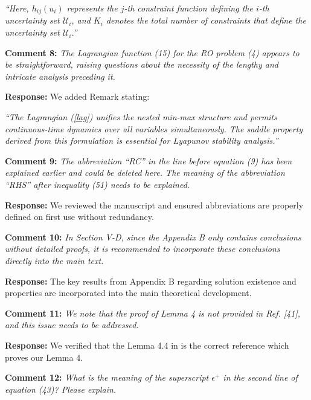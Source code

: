 \documentclass[journal,twoside,web]{ieeecolor}
\begin{document}
{\color{revisionblue}\textit{``Here, $h_{ij}(u_i)$ represents the $j$-th constraint function defining the $i$-th uncertainty set $\mathcal{U}_i$, and $K_i$ denotes the total number of constraints that define the uncertainty set $\mathcal{U}_i$.''}}

\vspace{0.5em}
\noindent\textbf{Comment 8:} \textit{The Lagrangian function (15) for the RO problem (4) appears to be straightforward, raising questions about the necessity of the lengthy and intricate analysis preceding it.}

\noindent\textbf{Response:} We added Remark stating:

{\color{revisionblue}\textit{``The Lagrangian (\ref{lag}) unifies the nested min-max structure and permits continuous-time dynamics over all variables simultaneously. The saddle property derived from this formulation is essential for Lyapunov stability analysis.''}}

\vspace{0.5em}
\noindent\textbf{Comment 9:} \textit{The abbreviation ``RC'' in the line before equation (9) has been explained earlier and could be deleted here. The meaning of the abbreviation ``RHS'' after inequality (51) needs to be explained.}

\noindent\textbf{Response:} We reviewed the manuscript and ensured abbreviations are properly defined on first use without redundancy.

\vspace{0.5em}
\noindent\textbf{Comment 10:} \textit{In Section V-D, since the Appendix B only contains conclusions without detailed proofs, it is recommended to incorporate these conclusions directly into the main text.}

\noindent\textbf{Response:} The key results from Appendix B regarding solution existence and properties are incorporated into the main theoretical development.

\vspace{0.5em}
\noindent\textbf{Comment 11:} \textit{We note that the proof of Lemma 4 is not provided in Ref. [41], and this issue needs to be addressed.}

\noindent\textbf{Response:} We verified that the Lemma 4.4 in \cite{cherukuri2016} is the correct reference which proves our Lemma 4.

\vspace{0.5em}
\noindent\textbf{Comment 12:} \textit{What is the meaning of the superscript $\epsilon^+$ in the second line of equation (43)? Please explain.}
\end{document}
